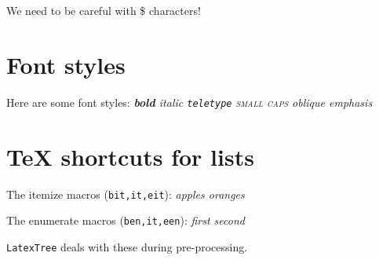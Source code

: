 We need to be careful with \$ characters!

\section{Font styles}
Here are some font styles: 
\bit
\it \textbf{bold}
\it \textit{italic}
\it \texttt{teletype}
\it \textsc{small caps} 
\it \textsl{oblique}
\it \emph{emphasis}
\eit

\section{TeX shortcuts for lists}
The itemize macros (\texttt{bit,it,eit}):
\bit
\it apples
\it oranges
\eit

The enumerate macros (\texttt{ben,it,een}):
\ben
\it first
\it second
\een

{\tt LatexTree} deals with these during pre-processing.

